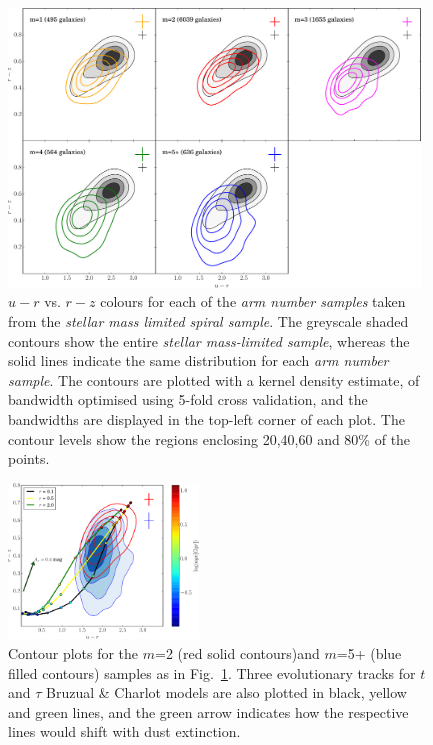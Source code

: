 \documentclass[useAMS,usenatbib]{mn2e}
\begin{document}
\begin{figure}
		\centering

        \includegraphics[width=0.975\textwidth]{Images/Results/cc1.pdf}

        \caption{$u-r$ vs. $r-z$ colours for each of the \textit{arm number samples} taken from the \textit{stellar mass limited spiral sample}. The greyscale shaded contours show the entire \textit{stellar mass-limited sample}, whereas the solid lines indicate the same distribution for each \textit{arm number sample}. The contours are plotted with a kernel density estimate, of bandwidth optimised using 5-fold cross validation, and the bandwidths are displayed in the top-left corner of each plot. The contour levels show the regions enclosing 20,40,60 and 80\% of the points.}

        \label{fig:colour-colour}

\end{figure}

\begin{figure}
		\centering

        \includegraphics[width=0.45\textwidth]{Images/Results/cc1_w_sfh.pdf}

        \caption{Contour plots for the $m$=2 (red solid contours)and $m$=5+ (blue filled contours) samples as in Fig.~\ref{fig:colour-colour}. Three evolutionary tracks for $t$ and $\tau$ Bruzual \& Charlot models are also plotted in black, yellow and green lines, and the green arrow indicates how the respective lines would shift with dust extinction.}

        \label{fig:cc_w_sfh}

\end{figure}
\end{document}
